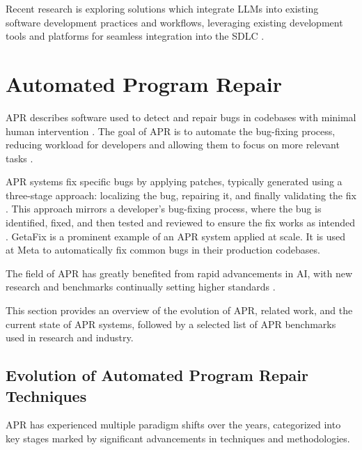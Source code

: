 Recent research is exploring solutions which integrate \acp{LLM} into existing software development practices and workflows, leveraging existing development tools and platforms for seamless integration into the \ac{SDLC} \cite{puvvadiCodingAgentsComprehensive2025, dohmkeGitHubCopilotMeet2025, IntroducingCodex, sauvolaFutureSoftwareDevelopment2024}.

\section{Automated Program Repair}

\ac{APR} describes software used to detect and repair bugs in codebases with minimal human intervention \cite{zhangSurveyLearningbasedAutomated2024}. The goal of APR is to automate the bug-fixing process, reducing workload for developers and allowing them to focus on more relevant tasks \cite{houLargeLanguageModels2024}.

APR systems fix specific bugs by applying patches, typically generated using a three-stage approach: localizing the bug, repairing it, and finally validating the fix \cite{zhangSurveyLearningbasedAutomated2024, baderGetafixLearningFix2019}. This approach mirrors a developer's bug-fixing process, where the bug is identified, fixed, and then tested and reviewed to ensure the fix works as intended \cite{yangSWEagentAgentComputerInterfaces2024}. GetaFix is a prominent example of an APR system applied at scale. It is used at Meta to automatically fix common bugs in their production codebases. \cite{baderGetafixLearningFix2019}

The field of APR has greatly benefited from rapid advancements in \ac{AI}, with new research and benchmarks continually setting higher standards \cite{puvvadiCodingAgentsComprehensive2025, houLargeLanguageModels2024}.

This section provides an overview of the evolution of APR, related work, and the current state of APR systems, followed by a selected list of APR benchmarks used in research and industry.

\subsection{Evolution of Automated Program Repair Techniques} \label{subsection:evolution-apr}

\ac{APR} has experienced multiple paradigm shifts over the years, categorized into key stages marked by significant advancements in techniques and methodologies.

